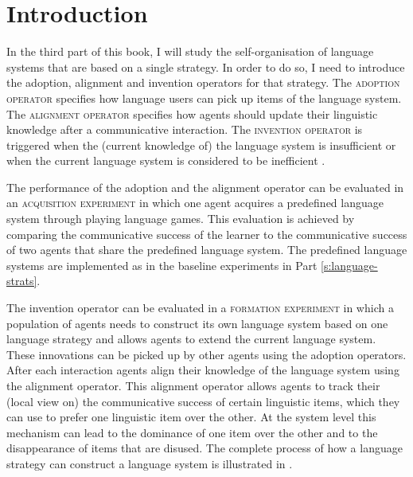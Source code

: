 \section*{Introduction}

\addtocounter{chapter}{1}
\setcounter{figure}{0}

In the third part of this book, I will study the self-organisation of
language systems that are based on a single strategy. In order to do
so, I need to introduce the adoption, alignment and invention
operators for that strategy. The \textsc{adoption operator} specifies how language users can pick up items of the language
system. The \textsc{alignment operator}
specifies how agents should
update their linguistic knowledge after a communicative
interaction. The \textsc{invention operator}
is triggered when the
(current knowledge of) the language system is insufficient or when the
current language system is considered to be inefficient
\citep{steels06how}.

The performance of the adoption and the alignment operator can be
evaluated in an \textsc{acquisition experiment} 
in which one agent
acquires a predefined language system through playing language games.
This evaluation is achieved by comparing the communicative success of the
learner to the communicative success of two agents that share the
predefined language system. The predefined language systems are
implemented as in the baseline experiments in Part
\ref{s:language-strats}.

The invention operator can be evaluated in a \textsc{formation
  experiment} in which a population of
agents needs to construct its own language system based on one
language strategy and allows agents to extend the current language
system. These innovations can be picked up by other agents using the
adoption operators. After each interaction agents align their
knowledge of the language system using the alignment operator. This
alignment operator allows agents to track their (local view on) the
communicative success of certain linguistic items, which they can use
to prefer one linguistic item over the other. At the system level this
mechanism can lead to the dominance of one item over the other and to
the disappearance of items that are disused. The complete process of
how a language strategy can construct a language system is illustrated
in .\enlargethispage{3\baselineskip}

